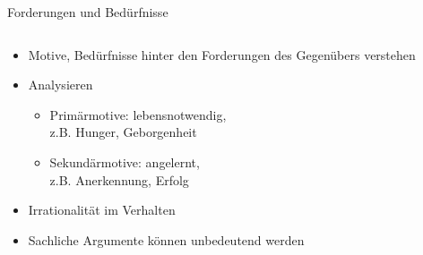 \begin{frame}{Forderungen und Bedürfnisse}

  \begin{columns}[c]
    \begin{column}{.55\textwidth}

      {\small
      \begin{itemize}
        \item Motive, Bedürfnisse hinter den Forderungen des Gegenübers verstehen
          \cites[][p. 106]{mccarthy_advanced_2015}[][p. 156]{wannenwetsch_schluesselfaktoren_2009}
        \item Analysieren \cite[][ch. 4.4.2]{helmold_verhandlungskonzepte_2019}
          {\footnotesize
          \begin{itemize}
            \item Primärmotive: lebensnotwendig,\\z.B. Hunger, Geborgenheit
            \item Sekundärmotive: angelernt,\\z.B. Anerkennung, Erfolg
          \end{itemize}
          }
        \item Irrationalität im Verhalten \cite[][p. 12]{mccarthy_advanced_2015}
        \item Sachliche Argumente können unbedeutend werden 
      \end{itemize}
      }

    \end{column}


\end{columns}
\end{frame}
